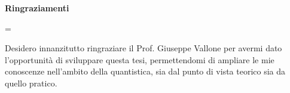 \cleardoublepage
\thispagestyle{empty}
\vspace*{\fill}
\centerline{\large\bfseries Ringraziamenti}
\nobreak
\vspace{1pc}
\begingroup\small
{}\textwidth
\rightskip=\leftskip

Desidero innanzitutto ringraziare il Prof. Giuseppe Vallone per avermi
dato l’opportunità di sviluppare questa tesi, permettendomi di ampliare
le mie conoscenze nell’ambito della quantistica, sia
dal punto di vista teorico sia da quello pratico.
\par\endgroup
\vspace{\fill}
\clearpage
